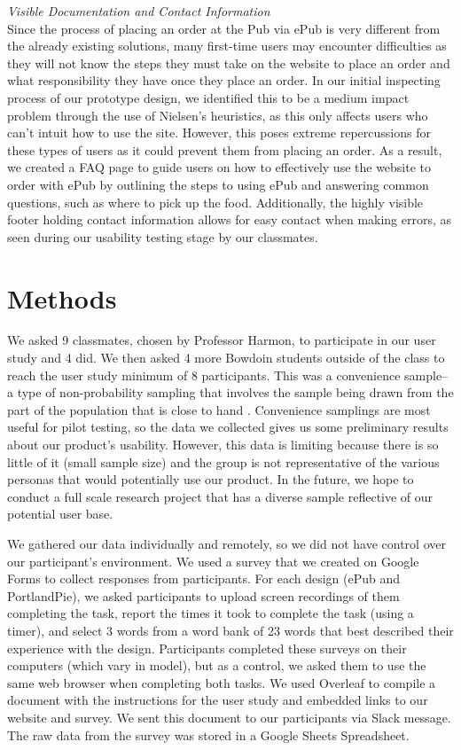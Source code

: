 \documentclass[runningheads]{llncs}
\begin{document}
\noindent \textit{Visible Documentation and Contact Information}\\
Since the process of placing an order at the Pub via ePub is very different from the already existing solutions, many first-time users may encounter difficulties as they will not know the steps they must take on the website to place an order and what responsibility they have once they place an order. In our initial inspecting process of our prototype design, we identified this to be a medium impact problem through the use of Nielsen’s heuristics, as this only affects users who can’t intuit how to use the site. However, this poses extreme repercussions for these types of users as it could prevent them from placing an order. As a result, we created a FAQ page to guide users on how to effectively use the website to order with ePub by outlining the steps to using ePub and answering common questions, such as where to pick up the food. Additionally, the highly visible footer holding contact information allows for easy contact when making errors, as seen during our usability testing stage by our classmates.\\

\section{Methods}
We asked 9 classmates, chosen by Professor Harmon, to participate in our user study and 4 did. We then asked 4 more Bowdoin students outside of the class to reach the user study minimum of 8 participants. This was a convenience sample--a type of non-probability sampling that involves the sample being drawn from the part of the population that is close to hand \cite{wikiconveniencesampling}. Convenience samplings are most useful for pilot testing, so the data we collected gives us some preliminary results about our product’s usability. However, this data is limiting because there is so little of it (small sample size) and the group is not representative of the various personas that would potentially use our product. In the future, we hope to conduct a full scale research project that has a diverse sample reflective of our potential user base.

We gathered our data individually and remotely, so we did not have control over our participant’s environment. We used a survey that we created on Google Forms to collect responses from participants. For each design (ePub and PortlandPie), we asked participants to upload screen recordings of them completing the task, report the times it took to complete the task (using a timer), and select 3 words from a word bank of  23 words that best described their experience with the design. Participants completed these surveys on their computers (which vary in model), but as a control, we asked them to use the same web browser when completing both tasks. We used Overleaf to compile a document with the instructions for the user study and embedded links to our website and survey. We sent this document to our participants via Slack message. The raw data from the survey was stored in a Google Sheets Spreadsheet.
\end{document}
